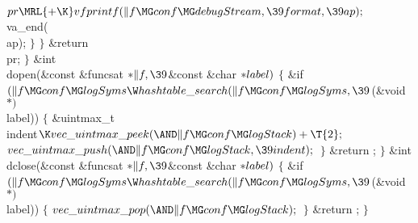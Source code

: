 {{{{{${}\\{pr}\MRL{+{\K}}\\{vfprintf}(\|f\MG\\{conf}\MG\\{debugStream},\39%
\\{format},\39\\{ap});{}$\6
\\{va\_end}(\\{ap});\6
\4${}\}{}$\2\6
\4${}\}{}$\2\6
\&{return} \\{pr};\6
\4${}\}{}$\2\7
\&{int} \\{dopen}(\&{const} \&{funcsat} ${}{*}\|f,\39{}$\&{const} \&{char}
${}{*}\\{label}){}$\1\1\2\2\6
${}\{{}$\1\6
\&{if} ${}(\|f\MG\\{conf}\MG\\{logSyms}\W\\{hashtable\_search}(\|f\MG\\{conf}%
\MG\\{logSyms},\39{}$(\&{void} ${}{*}){}$ \\{label}))\5
${}\{{}$\1\6
\&{uintmax\_t} \\{indent}${}\K\\{vec\_uintmax\_peek}({\AND}\|f\MG\\{conf}\MG%
\\{logStack})+\T{2};{}$\7
${}\\{vec\_uintmax\_push}({\AND}\|f\MG\\{conf}\MG\\{logStack},\39%
\\{indent});{}$\6
\4${}\}{}$\2\6
\&{return} ;\6
\4${}\}{}$\2\7
\&{int} \\{dclose}(\&{const} \&{funcsat} ${}{*}\|f,\39{}$\&{const} \&{char}
${}{*}\\{label}){}$\1\1\2\2\6
${}\{{}$\1\6
\&{if} ${}(\|f\MG\\{conf}\MG\\{logSyms}\W\\{hashtable\_search}(\|f\MG\\{conf}%
\MG\\{logSyms},\39{}$(\&{void} ${}{*}){}$ \\{label}))\5
${}\{{}$\1\6
${}\\{vec\_uintmax\_pop}({\AND}\|f\MG\\{conf}\MG\\{logStack});{}$\6
\4${}\}{}$\2\6
\&{return} ;\6
\4${}\}{}$\2\par
\fi

}}}}}
